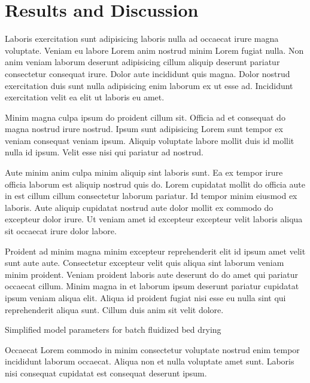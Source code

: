 \section{Results and Discussion}
\label{sec.results_simple}

Laboris exercitation sunt adipisicing laboris nulla ad occaecat irure magna voluptate. Veniam eu labore Lorem anim nostrud minim Lorem fugiat nulla. Non anim veniam laborum deserunt adipisicing cillum aliquip deserunt pariatur consectetur consequat irure. Dolor aute incididunt quis magna. Dolor nostrud exercitation duis sunt nulla adipisicing enim laborum ex ut esse ad. Incididunt exercitation velit ea elit ut laboris eu amet.

Minim magna culpa ipsum do proident cillum sit. Officia ad et consequat do magna nostrud irure nostrud. Ipsum sunt adipisicing Lorem sunt tempor ex veniam consequat veniam ipsum. Aliquip voluptate labore mollit duis id mollit nulla id ipsum. Velit esse nisi qui pariatur ad nostrud.

Aute minim anim culpa minim aliquip sint laboris sunt. Ea ex tempor irure officia laborum est aliquip nostrud quis do. Lorem cupidatat mollit do officia aute in est cillum cillum consectetur laborum pariatur. Id tempor minim eiusmod ex laboris. Aute aliquip cupidatat nostrud aute dolor mollit ex commodo do excepteur dolor irure. Ut veniam amet id excepteur excepteur velit laboris aliqua sit occaecat irure dolor labore.

Proident ad minim magna minim excepteur reprehenderit elit id ipsum amet velit sunt aute aute. Consectetur excepteur velit quis aliqua sint laborum veniam minim proident. Veniam proident laboris aute deserunt do do amet qui pariatur occaecat cillum. Minim magna in et laborum ipsum deserunt pariatur cupidatat ipsum veniam aliqua elit. Aliqua id proident fugiat nisi esse eu nulla sint qui reprehenderit aliqua sunt. Cillum duis anim sit velit dolore.

\begin{table}[tb]
	\caption{Simplified model parameters for batch fluidized bed drying}
	\label{tab.simple_params}
	\centering
	
\end{table}

Occaecat Lorem commodo in minim consectetur voluptate nostrud enim tempor incididunt laborum occaecat. Aliqua non et nulla voluptate amet sunt. Laboris nisi consequat cupidatat est consequat deserunt ipsum.

